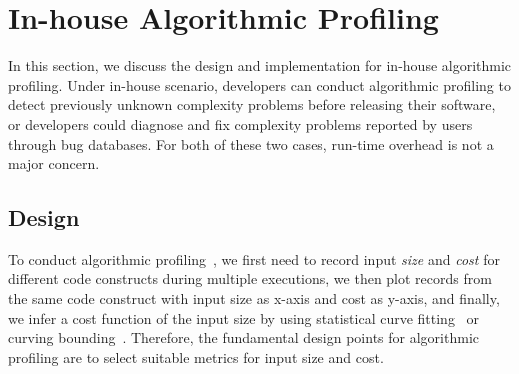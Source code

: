 \section{In-house Algorithmic Profiling}
\label{sec:inhouse}

In this section, we discuss the design and implementation for in-house algorithmic profiling.
Under in-house scenario, 
developers can conduct algorithmic profiling 
to detect previously unknown complexity problems before releasing their software, 
or developers could diagnose and fix complexity problems reported by users through bug databases.
For both of these two cases, 
run-time overhead is not a major concern. 

\subsection{Design}
To conduct algorithmic profiling~\cite{Aprof1,Aprof2,AlgoProf},
we first need to record input \textit{size} and \textit{cost} for different code constructs 
during multiple executions,
we then plot records from the same code construct with input size as x-axis and cost as y-axis, 
and finally, we infer a cost function of the input size by using 
statistical curve fitting~\cite{curve-fitting} 
or curving bounding~\cite{curve-bounding}. 
Therefore, the fundamental design points for algorithmic 
profiling are to select suitable metrics for input size and cost. 



